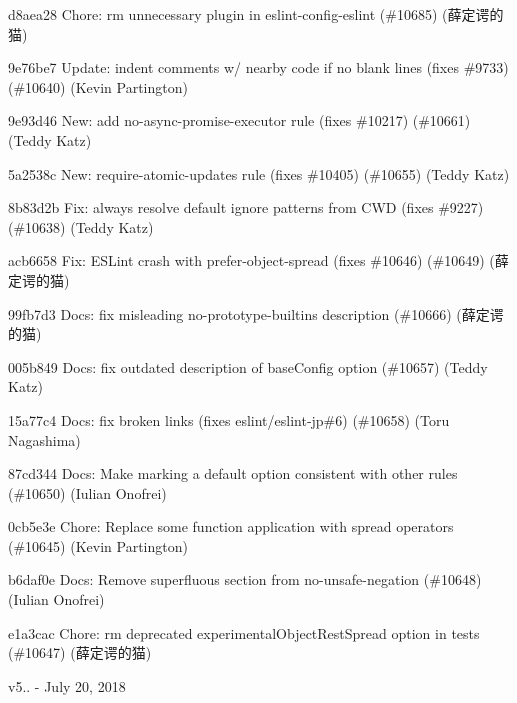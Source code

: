 \begin{DoxyItemize}
\item d8aea28 Chore\+: rm unnecessary plugin in eslint-\/config-\/eslint (\#10685) (薛定谔的猫)
\item 9e76be7 Update\+: indent comments w/ nearby code if no blank lines (fixes \#9733) (\#10640) (Kevin Partington)
\item 9e93d46 New\+: add no-\/async-\/promise-\/executor rule (fixes \#10217) (\#10661) (Teddy Katz)
\item 5a2538c New\+: require-\/atomic-\/updates rule (fixes \#10405) (\#10655) (Teddy Katz)
\item 8b83d2b Fix\+: always resolve default ignore patterns from C\+WD (fixes \#9227) (\#10638) (Teddy Katz)
\item acb6658 Fix\+: E\+S\+Lint crash with prefer-\/object-\/spread (fixes \#10646) (\#10649) (薛定谔的猫)
\item 99fb7d3 Docs\+: fix misleading no-\/prototype-\/builtins description (\#10666) (薛定谔的猫)
\item 005b849 Docs\+: fix outdated description of {\ttfamily base\+Config} option (\#10657) (Teddy Katz)
\item 15a77c4 Docs\+: fix broken links (fixes eslint/eslint-\/jp\#6) (\#10658) (Toru Nagashima)
\item 87cd344 Docs\+: Make marking a default option consistent with other rules (\#10650) (Iulian Onofrei)
\item 0cb5e3e Chore\+: Replace some function application with spread operators (\#10645) (Kevin Partington)
\item b6daf0e Docs\+: Remove superfluous section from no-\/unsafe-\/negation (\#10648) (Iulian Onofrei)
\item e1a3cac Chore\+: rm deprecated experimental\+Object\+Rest\+Spread option in tests (\#10647) (薛定谔的猫)
\end{DoxyItemize}

v5.. -\/ July 20, 2018


